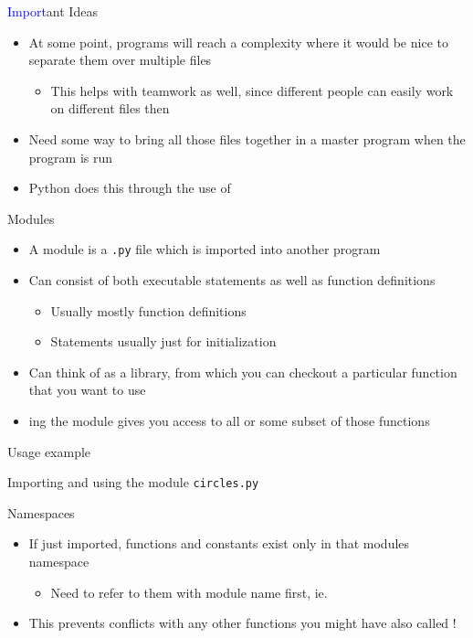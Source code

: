 \documentclass[pdf, aspectratio=169, 12pt]{beamer}
\begin{document}
\begin{frame}{\textcolor{Blue}{Import}ant Ideas}
	\begin{itemize}
		\item At some point, programs will reach a complexity where it would be nice to separate them over multiple files
			\begin{itemize}
				\item This helps with teamwork as well, since different people can easily work on different files then
			\end{itemize}
		\item Need some way to bring all those files together in a master program when the program is run
		\item Python does this through the use of 
	\end{itemize}
\end{frame}

\begin{frame}{Modules}
	\begin{itemize}
		\item A \alert{module} is a \texttt{.py} file which is imported into another program
		\item Can consist of both executable statements as well as function definitions
			\begin{itemize}
				\item Usually mostly function definitions
				\item Statements usually just for initialization
			\end{itemize}
		\item Can think of as a library, from which you can checkout a particular function that you want to use
		\item {}ing the module gives you access to all or some subset of those functions
	\end{itemize}
\end{frame}

\begin{frame}{Usage example}
	\begin{example}
		Importing and using the module \texttt{circles.py}
	\end{example}
\end{frame}

\begin{frame}{Namespaces}
	\begin{itemize}
		\item If just imported, functions and constants exist only in that modules namespace
			\begin{itemize}
				\item Need to refer to them with module name first, ie. 
			\end{itemize}
		\item This prevents conflicts with any other functions you might have also called !
	\end{itemize}
\end{frame}
\end{document}

